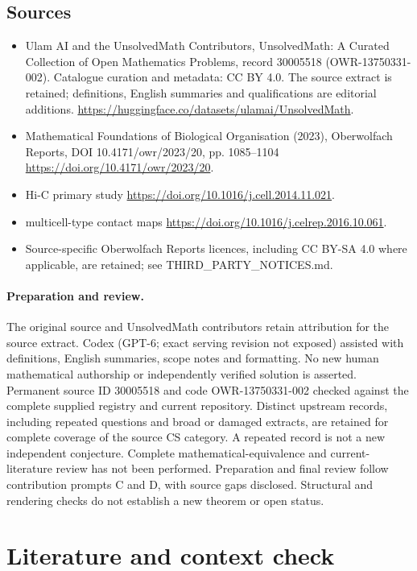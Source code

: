 \documentclass[11pt]{article}
\begin{document}
\subsection{Sources}
\begin{itemize}
\item[S1] Ulam AI and the UnsolvedMath Contributors, UnsolvedMath: A Curated Collection of Open Mathematics Problems, record 30005518 (OWR-13750331-002). Catalogue curation and metadata: CC BY 4.0. The source extract is retained; definitions, English summaries and qualifications are editorial additions.
\url{https://huggingface.co/datasets/ulamai/UnsolvedMath}.
\item[S2] Mathematical Foundations of Biological Organisation (2023), Oberwolfach Reports, DOI 10.4171/owr/2023/20, pp. 1085--1104
\url{https://doi.org/10.4171/owr/2023/20}.
\item[S3] Hi-C primary study
\url{https://doi.org/10.1016/j.cell.2014.11.021}.
\item[S4] multicell-type contact maps
\url{https://doi.org/10.1016/j.celrep.2016.10.061}.
\item Source-specific Oberwolfach Reports licences, including CC BY-SA 4.0 where applicable, are retained; see THIRD\_PARTY\_NOTICES.md.
\end{itemize}
\paragraph{Preparation and review.}
The original source and UnsolvedMath contributors retain attribution for the source extract. Codex (GPT-6; exact serving revision not exposed) assisted with definitions, English summaries, scope notes and formatting. No new human mathematical authorship or independently verified solution is asserted. Permanent source ID 30005518 and code OWR-13750331-002 checked against the complete supplied registry and current repository. Distinct upstream records, including repeated questions and broad or damaged extracts, are retained for complete coverage of the source CS category. A repeated record is not a new independent conjecture. Complete mathematical-equivalence and current-literature review has not been performed. Preparation and final review follow contribution prompts C and D, with source gaps disclosed. Structural and rendering checks do not establish a new theorem or open status.
\label{end:30005518}

\section{Literature and context check}
\end{document}

